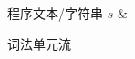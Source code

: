 
\begin{frame}{}
  \begin{center}
     程序文本/字符串 $s$ \& 

    \vspace{0.50cm}

    \vspace{0.30cm}
     词法单元流
  \end{center}
\end{frame}
